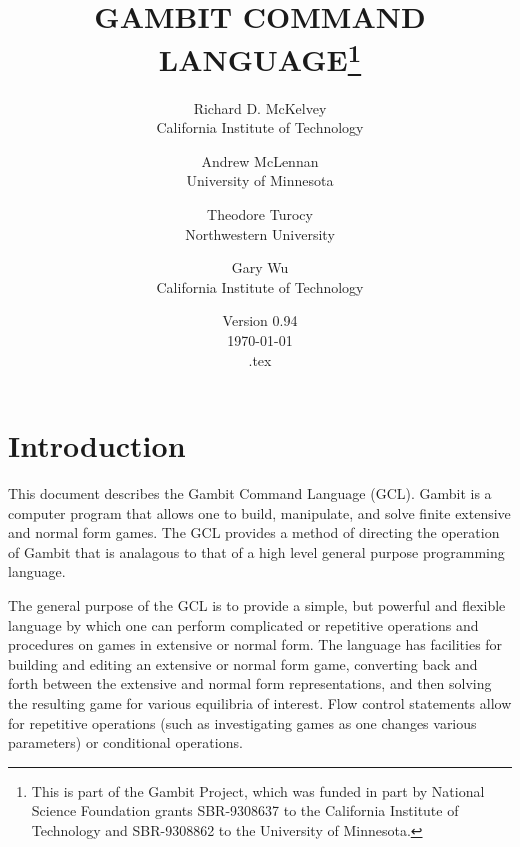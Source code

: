 %
%
%
\renewcommand{\baselinestretch}{.9}
\newcommand{\bd}{\begin{description}}
\newcommand{\ed}{\end{description}}




\title{GAMBIT COMMAND LANGUAGE\thanks{This is part of the Gambit
Project, which was funded in part by National Science Foundation
grants SBR-9308637 to the California Institute of Technology and
SBR-9308862 to the University of Minnesota.}}

\author{Richard D. McKelvey\\California Institute of
Technology
\and
Andrew McLennan\\University of
Minnesota
\and 
Theodore Turocy\\Northwestern University
\and
Gary Wu\\California Institute of Technology
}

\date{Version 0.94\\ \today\\ \jobname.tex}

\maketitle

\tableofcontents

\section{Introduction}

This document describes the Gambit Command Language (GCL).  Gambit is
a computer program that allows one to build, manipulate, and solve
finite extensive and normal form games. The GCL provides a method of
directing the operation of Gambit that is analagous to that of a high
level general purpose programming language.

The general purpose of the GCL is to provide a simple, but powerful
and flexible language by which one can perform complicated or
repetitive operations and procedures on games in extensive or normal
form.  The language has facilities for building and editing an
extensive or normal form game, converting back and forth between the
extensive and normal form representations, and then solving the
resulting game for various equilibria of interest. Flow
control statements allow for repetitive operations (such as
investigating games as one changes various parameters) or conditional
operations.

